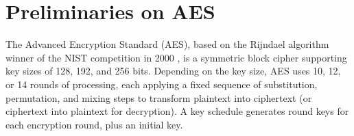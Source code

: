  
\section{Preliminaries on AES}
\label{sec:preliminaries_aes}

The Advanced Encryption Standard (AES), based on the Rijndael algorithm winner of the NIST competition in 2000 \cite{aes-original}, is a symmetric block cipher supporting key sizes of 128, 192, and 256 bits. Depending on the key size, AES uses 10, 12, or 14 rounds of processing, each applying a fixed sequence of substitution, permutation, and mixing steps to transform plaintext into ciphertext (or ciphertext into plaintext for decryption). A key schedule generates round keys for each encryption round, plus an initial key.

